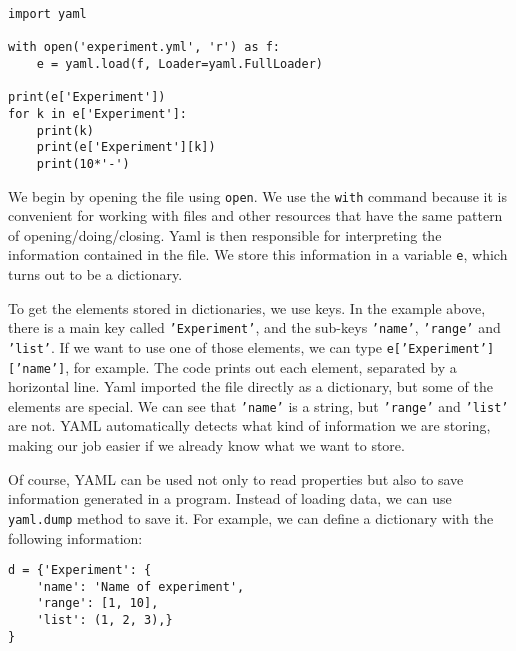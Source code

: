 \begin{verbatim}
import yaml

with open('experiment.yml', 'r') as f:
    e = yaml.load(f, Loader=yaml.FullLoader)

print(e['Experiment'])
for k in e['Experiment']:
    print(k)
    print(e['Experiment'][k])
    print(10*'-')
\end{verbatim}

We begin by opening the file using \texttt{open}. We use the \texttt{with} command because it is convenient for working with files and other resources that have the same pattern of opening/doing/closing. Yaml is then responsible for interpreting the information contained in the file. We store this information in a variable \texttt{e}, which turns out to be a dictionary.

To get the elements stored in dictionaries, we use keys. In the example above, there is a main key called \texttt{'Experiment'}, and the sub-keys \texttt{'name'}, \texttt{'range'} and \texttt{'list'}. If we want to use one of those elements, we can type \texttt{e['Experiment']['name']}, for example. The code prints out each element, separated by a horizontal line. Yaml imported the file directly as a dictionary, but some of the elements are special. We can see that \texttt{'name'} is a string, but \texttt{'range'} and \texttt{'list'} are not. {YAML} automatically detects what kind of information we are storing, making our job easier if we already know what we want to store.



Of course, YAML can be used not only to read properties but also to save information generated in a program. Instead of loading data, we can use \texttt{yaml.dump} method to save it. For example, we can define a dictionary with the following information:

\begin{verbatim}
d = {'Experiment': {
    'name': 'Name of experiment',
    'range': [1, 10],
    'list': (1, 2, 3),}
}
\end{verbatim}

